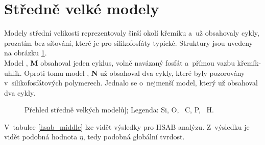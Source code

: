 \documentclass[
digital, %
table,   %
nolof,     %
nolot,     %
oneside,
]{fithesis3}
\renewcommand{\thesubfigure}{}
\begin{document}
\section{Středně velké modely}
Modely střední velikosti reprezentovaly širší okolí křemíku a~už obsahovaly cykly, prozatím bez síťování, které je pro silikofosfáty typické. Struktury jsou uvedeny na obrázku \ref{prehled_middle}. \\
Model , \textbf{M} obsahoval jeden cyklus, volně navázaný fosfát a~přímou vazbu křemík-uhlík. Oproti tomu model , \textbf{N} už obsahoval dva cykly, které byly pozorovány v~silikofosfátových polymerech. Jednalo se o~nejmenší model, který už obsahoval dva cykly.
\renewcommand{\thesubfigure}{}
\begin{figure}
\begin{center}
\caption{Přehled středně velkých modelů];  Legenda:  Si,  O, ~C,  P, ~H.}
\label{prehled_middle}
\end{center}
\end{figure}
V~tabulce \ref{hsab_middle} lze vidět výsledky pro HSAB analýzu. Z~výsledku je vidět podobná hodnota $\eta$, tedy podobná globální tvrdost.
\end{document}
